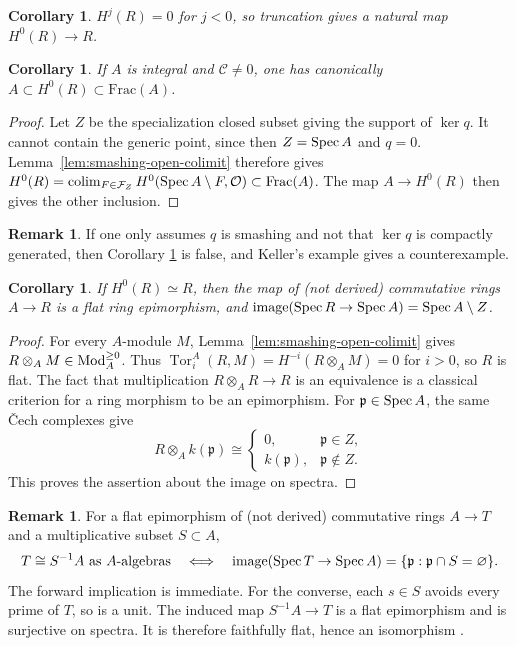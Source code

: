\documentclass[12pt, letter]{amsart}
\newtheorem{corollary}[theorem]{Corollary}
\theoremstyle{definition}
\newtheorem{remark}[theorem]{Remark}
\newcommand{\OO}{\mathcal O}
\numberwithin{equation}{section}
\begin{document}
\begin{corollary} \label{cor: B truncation}
    $H^j(R)=0$ for $j<0$, so truncation gives a natural map $H^0(R) \to R$.
\end{corollary}
\begin{corollary}  \label{cor: frac field embedding}
    If $A$ is  integral and $\mathcal{C} \ne 0$,  
    one has canonically 
    $A \subset H^0(R) \subset \mathrm{Frac}(A)$.
\end{corollary}
\begin{proof}
Let $Z$ be the specialization closed subset giving the support of $\ker q$. It cannot contain the generic point, since then
$Z=\operatorname{Spec} A$ and $q=0$.
Lemma~\ref{lem:smashing-open-colimit} therefore gives
$H^0(R)=\operatorname*{colim}_{F\in\mathcal F_Z}
       H^0(\Spec A\setminus F,\OO)\subset \operatorname{Frac}(A)$.
The map $A \to H^0(R)$ then gives the other inclusion.
\end{proof}

\begin{remark}
    If one only assumes $q$ is smashing and not that $\ker q$ is compactly generated, then Corollary \ref{cor: frac field embedding} is false, and Keller's example \cite[Section~2, Proposition]{Keller-smashing} gives a counterexample.
\end{remark}

\begin{corollary} \label{lem:discrete-smashing-flat}
If $H^0(R) \simeq R$, then the map of (not derived) commutative rings $A\to R$ is a flat ring epimorphism, and $\operatorname{image}(\operatorname{Spec} R\to\operatorname{Spec} A)=\operatorname{Spec} A\setminus Z$.
\end{corollary}
\begin{proof}
    For every $A$-module $M$, Lemma~\ref{lem:smashing-open-colimit} gives
$R\otimes_A M\in\operatorname{Mod}_A^{\ge0}$.
Thus $\operatorname{Tor}^A_i(R,M)=H^{-i}(R\otimes_A M)=0$ for $i>0$,
so $R$ is flat.  The fact that multiplication $R \otimes_A R \to R$ is an equivalence is a classical criterion for a ring morphism to be an epimorphism.
For $\mathfrak p\in\operatorname{Spec} A$, the same \v{C}ech complexes give
\[
 R\otimes_A k(\mathfrak p)\cong
 \begin{cases}
  0,&\mathfrak p\in Z,\\
  k(\mathfrak p),&\mathfrak p\notin Z.
 \end{cases}
\]
This proves the assertion about the image on spectra.
\end{proof}
\begin{remark}
For a flat epimorphism of (not derived) commutative rings $A\to T$ and a multiplicative subset $S\subset A$,
\[
 T\cong S^{-1}A\ \text{as $A$-algebras}
 \quad\Longleftrightarrow\quad
 \operatorname{image}(\operatorname{Spec} T\to\operatorname{Spec} A)
       =\{\mathfrak p:\mathfrak p\cap S=\varnothing\}.
\]
The forward implication is immediate.
For the converse, each $s\in S$ avoids every prime of $T$, so is a unit.
The induced map $S^{-1}A\to T$ is a flat epimorphism and is surjective
on spectra. It is therefore faithfully flat, hence an isomorphism
\cite[Tag~04VU]{Stacks-section23}.
\end{remark}
\end{document}
